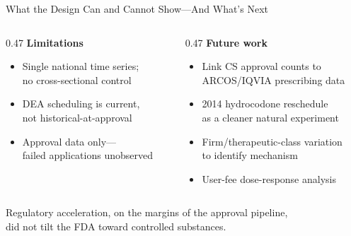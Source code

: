 \documentclass[10pt]{beamer}
\newcommand{\pdufahl}[1]{\textcolor{pdufacolor}{#1}}
\newcommand{\cshl}[1]{\textcolor{cscolor}{#1}}
\begin{document}
\begin{frame}{What the Design Can and Cannot Show---And What's Next}

  \begin{columns}[T]

    \begin{column}{0.47\textwidth}
      \textbf{Limitations}
      {\small
      \begin{itemize}
        \item Single national time series;\\no cross-sectional control
        \item DEA scheduling is current,\\not historical-at-approval
        \item Approval data only---\\failed applications unobserved
      \end{itemize}
      }
    \end{column}

    \begin{column}{0.47\textwidth}
      \textbf{Future work}
      {\small
      \begin{itemize}
        \item Link \cshl{CS} approval counts to\\ARCOS/IQVIA prescribing data
        \item 2014 hydrocodone reschedule\\as a cleaner natural experiment
        \item Firm/therapeutic-class variation\\to identify mechanism
        \item User-fee dose-response analysis
      \end{itemize}
      }
    \end{column}

  \end{columns}

  \vspace{1.2ex}
  \centering
  {\small\pdufahl{%
    Regulatory acceleration, on the margins of the approval pipeline,\\
    did not tilt the FDA toward \cshl{controlled substances}.}}

\end{frame}
\end{document}
